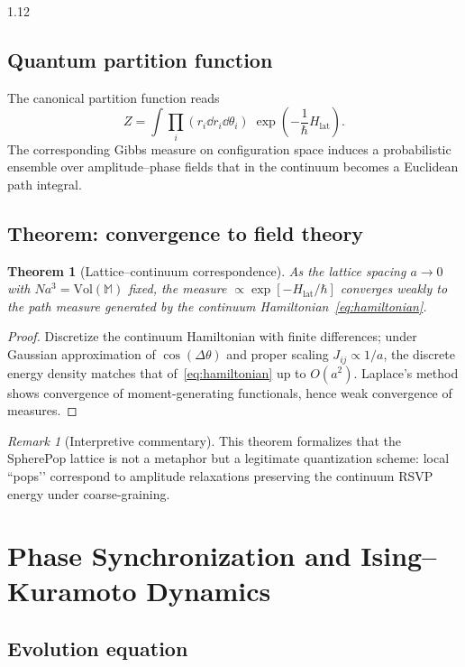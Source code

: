 \documentclass[12pt,a4paper]{article}
\numberwithin{equation}{section}
\newtheorem{theorem}{Theorem}[section]
\theoremstyle{remark}
\newtheorem{remark}{Remark}[section]
\theoremstyle{definition}
\newcommand{\M}{\mathbb{M}}
\begin{document}
\begin{spacing}{1.12}
\subsection{Quantum partition function}
\label{subsec:partition-function}
The canonical partition function reads
\[
Z = \int \prod_i (r_i \dd r_i \dd\theta_i)\;
\exp\!\left(-\frac{1}{\hbar} H_{\mathrm{lat}}\right).
\]
The corresponding Gibbs measure on configuration space induces a probabilistic ensemble over amplitude–phase fields that in the continuum becomes a Euclidean path integral.

\subsection{Theorem: convergence to field theory}
\label{subsec:lattice-limit}

\begin{theorem}[Lattice--continuum correspondence]
\label{thm:lattice-field}
As the lattice spacing $a\to0$ with $N a^3=\mathrm{Vol}(\M)$ fixed,
the measure $\propto\exp[-H_{\mathrm{lat}}/\hbar]$ converges weakly to the path measure generated by the continuum Hamiltonian~\eqref{eq:hamiltonian}.
\end{theorem}

\begin{proof}
Discretize the continuum Hamiltonian with finite differences; under Gaussian approximation of $\cos(\Delta\theta)$ and proper scaling $J_{ij}\propto 1/a$, the discrete energy density matches that of~\eqref{eq:hamiltonian} up to $O(a^2)$.
Laplace’s method shows convergence of moment-generating functionals, hence weak convergence of measures.
\end{proof}

\begin{remark}[Interpretive commentary]
This theorem formalizes that the SpherePop lattice is not a metaphor but a legitimate quantization scheme: local “pops’’ correspond to amplitude relaxations preserving the continuum RSVP energy under coarse-graining.
\end{remark}

\section{Phase Synchronization and Ising--Kuramoto Dynamics}
\label{sec:kuramoto}

\subsection{Evolution equation}
\label{subsec:kuramoto-eq}


\end{spacing}
\end{document}
